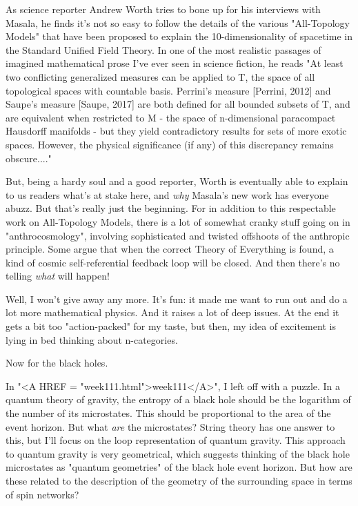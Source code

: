 As science reporter Andrew Worth tries to bone up for his interviews
with Masala, he finds it's not so easy to follow the details of the
various "All-Topology Models" that have been proposed to explain the
10-dimensionality of spacetime in the Standard Unified Field Theory.  In
one of the most realistic passages of imagined mathematical prose I've
ever seen in science fiction, he reads "At least two conflicting
generalized measures can be applied to T, the space of all topological
spaces with countable basis.  Perrini's measure [Perrini, 2012] and
Saupe's measure [Saupe, 2017] are both defined for all bounded subsets
of T, and are equivalent when restricted to M - the space of
n-dimensional paracompact Hausdorff manifolds - but they yield
contradictory results for sets of more exotic spaces.  However, the
physical significance (if any) of this discrepancy remains obscure...."

But, being a hardy soul and a good reporter, Worth is eventually able to
explain to us readers what's at stake here, and \emph{why} Masala's new work
has everyone abuzz.  But that's really just the beginning.  For in
addition to this respectable work on All-Topology Models, there is a lot
of somewhat cranky stuff going on in "anthrocosmology", involving
sophisticated and twisted offshoots of the anthropic principle.  Some
argue that when the correct Theory of Everything is found, a kind of
cosmic self-referential feedback loop will be closed.  And then there's
no telling \emph{what} will happen!  

Well, I won't give away any more.  It's fun: it made me want to run out
and do a lot more mathematical physics.  And it raises a lot of deep
issues.  At the end it gets a bit too "action-packed" for my taste, but
then, my idea of excitement is lying in bed thinking about n-categories.

Now for the black holes.

In "<A HREF = "week111.html">week111</A>", I left off with a puzzle.  In a quantum theory of gravity,
the entropy of a black hole should be the logarithm of the number of its
microstates.  This should be proportional to the area of the event
horizon.  But what \emph{are} the microstates?  String theory has one answer
to this, but I'll focus on the loop representation of quantum gravity.
This approach to quantum gravity is very geometrical, which suggests
thinking of the black hole microstates as "quantum geometries" of the
black hole event horizon.  But how are these related to the description
of the geometry of the surrounding space in terms of spin networks?


